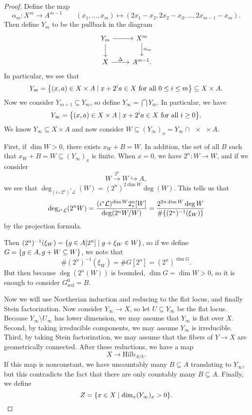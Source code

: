 \documentclass[leqno, openany]{memoir}
\theoremstyle{definition}
\theoremstyle{remark}
\theoremstyle{plain}
\theoremstyle{definition}
\theoremstyle{remark}
\newcommand{\mc}[1]{\mathcal{#1}}
\newcommand{\mr}[1]{\mathrm{#1}}
\begin{document}
\begin{proof}
    Define the map
    \[ \alpha_m \colon X^m \to A^{m-1} \qquad (x_1, \ldots, x_m) \mapsto (2 x_1 - x_2, 2 x_2 - x_3, \ldots, 2 x_{m-1} - x_m). \]
    Then define $Y_m$ to be the pullback in the diagram
    \begin{equation*}
    \begin{tikzcd}
        Y_m \ar{r} \ar{d} & X^m \ar{d}{\alpha_m} \\
        X \ar{r}{\Delta} & A^{m-1}.
    \end{tikzcd}
    \end{equation*}
    In particular, we see that
    \[ Y_m = \qty{(x, a) \in X \times A \mid x + 2^i a \in X \text{ for all }0 \leq i \leq m} \subseteq X \times A. \]
    Now we consider $Y_{m+1} \subseteq Y_m$, so define $Y_{\infty} = \bigcap Y_m$. In particular, we have
    \[ Y_{\infty} = \qty{(x, a) \in X \times A \mid x + 2^i a \in X \text{ for all } i \geq 0}. \]
    We know $Y_{\infty} \subseteq X \times A$ and now consider $W \subseteq (Y_{\infty})_x = Y_{\infty} \cap \qty{x} \times A$.

    First, if $\dim W > 0$, there exists $x_W + B = W$. In addition, the set of all $B$ such that $x_W + B = W \subseteq (Y_{\infty})_x$ is finite. When $x = 0$, we have $2^n \colon W \to W$, and if we consider
    \[ W \xrightarrow{2^n} W \hookrightarrow A, \]
    we see that $\deg_{(i \circ 2^n)^* \mc{L}} (W) = (2^n)^{2 \dim W} \deg (W)$. This tells us that
    \[ \deg_{i^* \mc{L}}(2^n W) = \frac{(i^* \mc{L})^{\dim W} 2^n_* [W]}{\deg (2^n W / W)} = \frac{2^{2n\dim W} \deg W}{\# \qty{(2^n)^{-1} (\xi_W)}} \]
    by the projection formula.

    Then $(2^n)^{-1}(\xi_W) = \qty{g \in A[2^n] \mid g + \xi_W \in W}$, so if we define $G = \qty{g \in A, g + W \subseteq W}$, we note that
    \[ \# (2^n)^{-1} (\xi_W) = \# G[2^n] = (2^n)^{\dim G}. \]
    But then because $\deg (2^n (W))$ is bounded, $\dim G = \dim W > 0$, so it is enough to consider $G_{\mr{red}}^0 = B$.

    Now we will use Noetherian induction and reducing to the flat locus, and finally Stein factorization. Now consider $Y_{\infty} \to X$, so let $U \subseteq Y_{\infty}$ be the flat locus. Because $Y_{\infty} \setminus U_{\infty}$ has lower dimension, we may assume that $Y_{\infty}$ is flat over $X$. Second, by taking irreducible components, we may assume $Y_{\infty}$ is irreducible. Third, by taking Stein factorization, we may assume that the fibers of $Y \to X$ are geometrically connected. After these reductions, we have a map
    \[ X \to \mr{Hilb}_{A/k}. \]
    If this map is nonconstant, we have uncountably many $B \subseteq A$ translating to $Y_{\infty}$, but this contradicts the fact that there are only countably many $B \subseteq A$. Finally, we define
    \[ Z = \qty{x \in X \mid \dim_x (Y_{\infty})_x > 0}. \qedhere \]
\end{proof}
\end{document}
